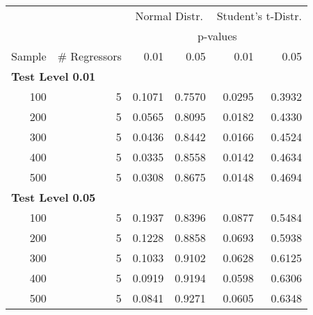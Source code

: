 \begin{table}
\centering
\begin{tabular}{r|r|r|r|r|r}
\hline
\multicolumn{2}{c|}{ } & \multicolumn{2}{c|}{Normal Distr.} & \multicolumn{2}{c}{Student's t-Distr.} \\
\cline{3-4} \cline{5-6}
\multicolumn{2}{c|}{ } & \multicolumn{4}{c}{p-values} \\
\cline{3-6}
Sample & \# Regressors & 0.01 & 0.05 & 0.01 & 0.05\\
\hline
\multicolumn{6}{l}{\textbf{Test Level 0.01}}\\
\hline
\hspace{1em}100 & 5 & 0.1071 & 0.7570 & 0.0295 & 0.3932\\
\hline
\hspace{1em}200 & 5 & 0.0565 & 0.8095 & 0.0182 & 0.4330\\
\hline
\hspace{1em}300 & 5 & 0.0436 & 0.8442 & 0.0166 & 0.4524\\
\hline
\hspace{1em}400 & 5 & 0.0335 & 0.8558 & 0.0142 & 0.4634\\
\hline
\hspace{1em}500 & 5 & 0.0308 & 0.8675 & 0.0148 & 0.4694\\
\hline
\multicolumn{6}{l}{\textbf{Test Level 0.05}}\\
\hline
\hspace{1em}100 & 5 & 0.1937 & 0.8396 & 0.0877 & 0.5484\\
\hline
\hspace{1em}200 & 5 & 0.1228 & 0.8858 & 0.0693 & 0.5938\\
\hline
\hspace{1em}300 & 5 & 0.1033 & 0.9102 & 0.0628 & 0.6125\\
\hline
\hspace{1em}400 & 5 & 0.0919 & 0.9194 & 0.0598 & 0.6306\\
\hline
\hspace{1em}500 & 5 & 0.0841 & 0.9271 & 0.0605 & 0.6348\\
\hline
\end{tabular}
\end{table}
